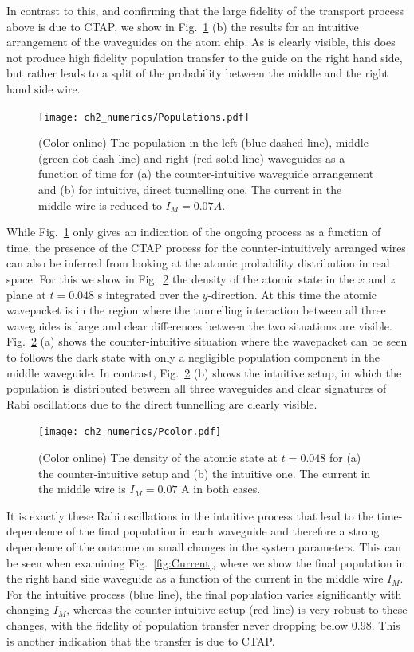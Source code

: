 In contrast to this, and confirming that the large fidelity of the transport process above is due to CTAP, we show in Fig.~\ref{fig:Populations} (b) the results for an intuitive arrangement of the waveguides on the atom chip. As is clearly visible, this does not produce high fidelity population transfer to the guide on the right hand side, but rather leads to a split of the probability between the middle and the right hand side wire.

\begin{figure}[tb]
  \texttt{[image: ch2\_numerics/Populations.pdf]}
  \caption{(Color online) The population in the left (blue dashed line), middle (green dot-dash line) and right (red solid line) waveguides as a function of time for (a) the counter-intuitive waveguide arrangement and (b) for intuitive, direct tunnelling one. The current in the middle wire is reduced to $I_M=0.07 A$.}
  \label{fig:Populations}
\end{figure}

While Fig.~\ref{fig:Populations} only gives an indication of the ongoing process as a function of time, the presence of the CTAP process for the counter-intuitively arranged wires can also be inferred from looking at the atomic probability distribution in real space. For this we show in Fig.~\ref{fig:Pcolor}  the density of the atomic state in the $x$ and $z$ plane at $t=0.048$ s integrated over the $y$-direction. At this time the atomic wavepacket is in the region where the tunnelling interaction between all three waveguides is large and clear differences between the two situations are visible. Fig.~\ref{fig:Pcolor} (a) shows the counter-intuitive situation where the wavepacket can be seen to follows the dark state with only a negligible population component in the middle waveguide. In contrast, Fig.~\ref{fig:Pcolor} (b) shows the intuitive setup, in which the population is distributed between all three waveguides and clear signatures of Rabi oscillations due to the direct tunnelling are clearly visible.

\begin{figure}[tb]
  \texttt{[image: ch2\_numerics/Pcolor.pdf]}
  \caption{(Color online) The density of the atomic state at $t=0.048$ for (a) the counter-intuitive setup and (b) the intuitive one. The current in the middle wire is $I_M=0.07$ A in both cases.}
  \label{fig:Pcolor}
\end{figure}

It is exactly these Rabi oscillations in the intuitive process that lead to the time-dependence of the final population in each waveguide and therefore a strong dependence of the outcome on small changes in the system parameters. This can be seen when examining Fig.~\ref{fig:Current}, where we show the final population in the right hand side waveguide as a function of the current in the middle wire $I_M$. For the intuitive process (blue line), the final population varies significantly with changing $I_M$, whereas the counter-intuitive setup (red line) is very robust to these changes, with the fidelity of population transfer never dropping below $0.98$. This is another indication that the transfer is due to CTAP.

